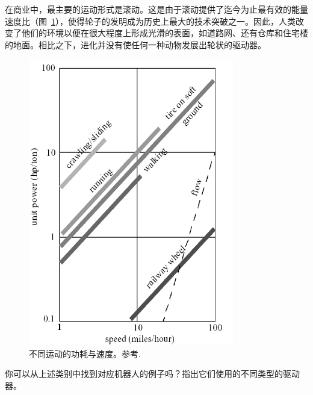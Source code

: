 在商业中，最主要的运动形式是滚动。这是由于滚动提供了迄今为止最有效的能量速度比（图~\ref{fig:todd}），使得轮子的发明成为历史上最大的技术突破之一。因此，人类改变了他们的环境以便在很大程度上形成光滑的表面，如道路网、还有仓库和住宅楼的地面。相比之下，进化并没有使任何一种动物发展出轮状的驱动器。

\begin{figure}
	\centering
		\includegraphics[width=0.8\textwidth]{figs/todd85.png}
	\caption{不同运动的功耗与速度。参考\protect{}.}
	\label{fig:todd}
\end{figure}

\begin{framed}
你可以从上述类别中找到对应机器人的例子吗？指出它们使用的不同类型的驱动器。
\end{framed}


